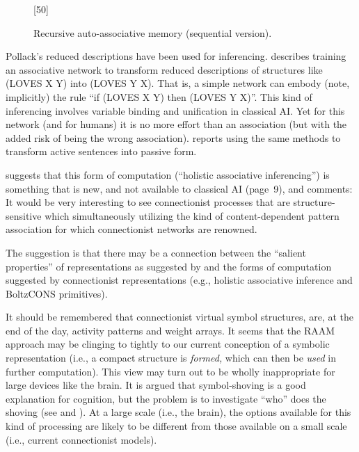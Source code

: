 \begin{figure}
[50]
\vspace{2.6 in}
\caption{Recursive auto-associative memory (sequential version).}
\label{rdr}
\end{figure}

Pollack's reduced descriptions have been used
for inferencing.   describes training an associative
network to transform reduced descriptions of structures
like (LOVES X Y) into (LOVES Y X).  That is, a simple network can
embody (note, implicitly) the
rule ``if (LOVES X Y) then (LOVES Y X)''. This kind of
inferencing involves variable binding and unification in classical
AI.  Yet for this network (and for humans) it is no more effort than
an association (but with the added risk of being the wrong
association).  reports using the same methods to
transform active sentences into passive form.

 suggests that this form of computation (``holistic
associative inferencing'') is something that is new, and not available
to classical AI (page~9), and comments:
\bssq
It would be very interesting to see connectionist processes that are
structure-sensitive which simultaneously utilizing the kind of
content-dependent pattern association for which connectionist networks
are re\-nown\-ed.
\essq

The suggestion is that there may be a connection between the ``salient
properties'' of representations as suggested by  and
the forms of computation suggested by connectionist representations
(e.g., holistic associative inference and BoltzCONS primitives).

It should be remembered that connectionist virtual symbol structures,
are, at the end of the day, activity patterns and weight arrays.  It
seems that the RAAM approach may be clinging to tightly to our current
conception of a symbolic representation (i.e., a compact structure is
{\em formed,} which can then be {\em used\/} in further computation).
This view may turn out to be wholly inappropriate for large devices
like the brain. It is argued that symbol-shoving is a good explanation
for cognition, but the problem is to investigate ``who'' does the
shoving (see  and ). At a large scale
(i.e., the brain), the options available for this kind of processing
are likely to be different from those available on a small scale
(i.e., current connectionist models).



